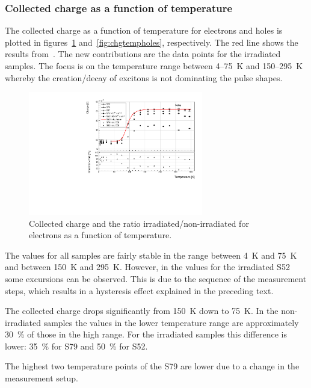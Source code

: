 \subsubsection{Collected charge as a function of temperature}
\label{subsec:qvst}
 The collected charge as a function of temperature for electrons and holes is plotted in figures~\ref{fig:chgtempelecs} and~\ref{fig:chgtempholes}, respectively. The red line shows the results from~\cite{Jansen:1956431}. The new contributions are the data points for the irradiated samples. The focus is on the temperature range between 4--75~K and 150--295~K whereby the creation/decay of excitons is not dominating the pulse shapes.
\begin{figure}[!t]
\centering
\includegraphics[width=0.68\textwidth]{../scripts/03_experimental_results/plots/charge500V-1} 
\caption{Collected charge and the ratio irradiated/non-irradiated for electrons as a function of temperature.}
\label{fig:chgtempelecs}
\end{figure}
The values for all samples are fairly stable in the range between 4~K and 75~K and between 150~K and 295~K. However, in the values for the irradiated S52 some excursions can be observed. This is due to the sequence of the measurement steps, which results in a hysteresis effect explained in the preceding text.

The collected charge drops significantly from 150~K down to 75~K. In the non-irradiated samples the values in the lower temperature range are approximately 30~\% of those in the high range. For the irradiated samples this difference is lower: 35~\% for S79 and 50~\% for S52.

The highest two temperature points of the S79 are lower due to a change in the measurement setup.

